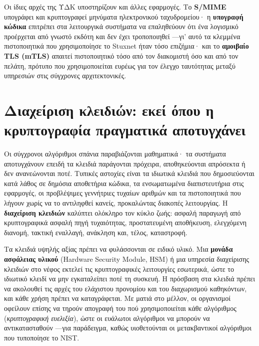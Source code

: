 \documentclass[11pt,openany]{book}
\begin{document}
Οι ίδιες αρχές της ΥΔΚ υποστηρίζουν και άλλες εφαρμογές. Το \textbf{S/MIME} υπογράφει και κρυπτογραφεί μηνύματα ηλεκτρονικού ταχυδρομείου· η \textbf{υπογραφή κώδικα} επιτρέπει στα λειτουργικά συστήματα να επαληθεύουν ότι ένα λογισμικό προέρχεται από γνωστό εκδότη και δεν έχει τροποποιηθεί —γι' αυτό τα κλεμμένα πιστοποιητικά που χρησιμοποίησε το Stuxnet ήταν τόσο επιζήμια· και το \textbf{αμοιβαίο TLS (mTLS)} απαιτεί πιστοποιητικό τόσο από τον διακομιστή όσο και από τον πελάτη, πρότυπο που χρησιμοποιείται ευρέως για τον έλεγχο ταυτότητας μεταξύ υπηρεσιών στις σύγχρονες αρχιτεκτονικές.

\section{Διαχείριση κλειδιών: εκεί όπου η κρυπτογραφία πραγματικά αποτυγχάνει}\label{sec:7.6}
Οι σύγχρονοι αλγόριθμοι σπάνια παραβιάζονται μαθηματικά· τα συστήματα αποτυγχάνουν επειδή τα κλειδιά παράγονται πρόχειρα, αποθηκεύονται απρόσεκτα ή δεν ανανεώνονται ποτέ. Τυπικές αστοχίες είναι τα ιδιωτικά κλειδιά που δημοσιεύονται κατά λάθος σε δημόσια αποθετήρια κώδικα, τα ενσωματωμένα διαπιστευτήρια στις εφαρμογές, οι προβλέψιμες γεννήτριες τυχαίων αριθμών και τα πιστοποιητικά που λήγουν χωρίς να το αντιληφθεί κανείς, προκαλώντας διακοπές λειτουργίας. Η \textbf{διαχείριση κλειδιών} καλύπτει ολόκληρο τον κύκλο ζωής: ασφαλή παραγωγή από κρυπτογραφικά ασφαλή πηγή τυχαιότητας, προστατευμένη αποθήκευση, ελεγχόμενη διανομή, τακτική εναλλαγή, ανάκληση και, τέλος, καταστροφή.

Τα κλειδιά υψηλής αξίας πρέπει να φυλάσσονται σε ειδικό υλικό. Μια \textbf{μονάδα ασφάλειας υλικού} (Hardware Security Module, HSM) ή μια υπηρεσία διαχείρισης κλειδιών στο νέφος εκτελεί τις κρυπτογραφικές λειτουργίες εσωτερικά, ώστε το ιδιωτικό κλειδί να μην εγκαταλείπει ποτέ τη συσκευή. Η πρόσβαση στα κλειδιά πρέπει να ακολουθεί τις αρχές του ελάχιστου προνομίου και του διαχωρισμού καθηκόντων, και κάθε χρήση πρέπει να καταγράφεται. Με ματιά στο μέλλον, οι οργανισμοί οφείλουν επίσης να τηρούν απογραφή του πού χρησιμοποιείται κάθε αλγόριθμος (\emph{κρυπτογραφική ευελιξία}), ώστε οι ευάλωτοι αλγόριθμοι να μπορούν να αντικατασταθούν —για παράδειγμα, καθώς υιοθετούνται οι μετακβαντικοί αλγόριθμοι που τυποποίησε το NIST.
\end{document}
